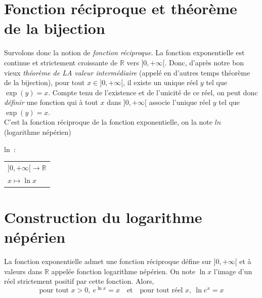 \documentclass[french]{book}
\newcommand{\bbr}{\mathbb{R}}
\begin{document}


% 

%
%
%
%

\vspace{0.5cm}
\section{Fonction réciproque et théorème de la bijection}
Survolons donc la notion de \textit{fonction réciproque}. La
fonction exponentielle est continue et strictement croissante de
$\mathbb{R}$ vers $]0,+\infty[$. Donc, d'après notre bon vieux
\textsl{théorème de LA valeur intermédiaire} (appelé en d'autres
temps théorème de la bijection),  pour tout $x\in]0,+\infty[$, il
existe un unique réel $y$ tel que $\exp(y)=x$. Compte tenu de
l'existence et de l'unicité de ce réel, on peut donc
\textit{définir} une fonction qui à tout $x$ dans $]0,+\infty[$
associe l'unique réel $y$ tel que $\exp(y)=x$.\\
 
 C'est la fonction
réciproque de la fonction exponentielle, on la note $ln$ (logarithme
népérien)
\begin{center}ln~:
\begin{tabular}{l} $]0,+\infty[\to\mathbb{R}$\\
$ x\mapsto \ln x$
\end{tabular}
\end{center}








\section{Construction du logarithme népérien}


\begin{thm}
    La fonction exponentielle admet une
fonction réciproque défine sur $]0,+\infty[$ et à valeurs dans
$\bbr$ appelée fonction logarithme népérien. On note $\ln x$
l'image d'un réel strictement positif par cette fonction.
Alors,
\[\text{pour tout } x>0,\ e^{\ln x}=x \quad \text{et}\quad \text{pour tout réel }
x,\ \ln e^x=x\] 
    \end{thm}
    
\end{document}
